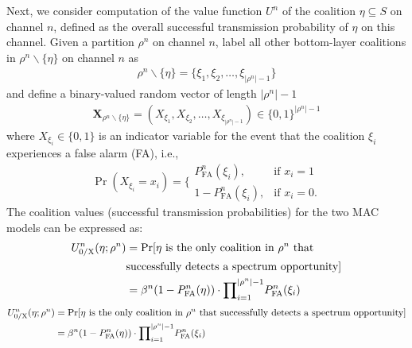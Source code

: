 \documentclass[journal,draftclsnofoot,onecolumn]{IEEEtran}
\theoremstyle{definition}
\newif\ifdoublecolumn
\begin{document}
Next, we consider computation of the value function $U^n$ of the coalition $\eta\subseteq S$ on channel $n$, defined as the overall successful transmission probability of $\eta$ on this channel. Given a partition $\rho^n$ on channel $n$, label all other bottom-layer coalitions in $\rho^n \backslash \{ \eta \}$ on channel $n$ as
\begin{equation}\label{Eq:ParitionExcept}
\begin{split}
\rho^n \backslash \{ \eta \}  {=} \{ {\xi _1},{\xi _2}, \ldots ,{\xi _{|\rho^n |- 1}}\}
\end{split}
\end{equation}
and define a binary-valued random vector of length $|\rho^n |{-} 1$ 
\begin{equation}\label{Eq:X}
\begin{split}
\mathbf{X}_{\rho^n\backslash\{\eta\}}=(X_{\xi_1},X_{\xi_2},\ldots,X_{\xi_{|\rho^n|-1}})\in\{0,1\}^{|\rho^n |- 1}
\end{split}
\end{equation}
where $X_{\xi_i}\!\in\!\{0,1\}$ is an indicator variable for the event that the coalition $\xi_i$ experiences a false alarm (FA), i.e.,
\begin{equation}\label{Eq:Indicator}
\Pr(X_{\xi_i}=x_i)=\Bigg\{\begin{matrix}
P_{\mathrm{FA}}^n({\xi _i}), & \textrm{if }x_i=1 \\ 
1-P_{\mathrm{FA}}^n({\xi _i}), & \textrm{if }x_i=0.
\end{matrix}
\end{equation}
The coalition values (successful transmission probabilities) for the two MAC models can be expressed as:
\ifdoublecolumn
\begin{align}\label{Eq:CoalValue0X}
U_\mathrm{0/X}^n(\eta;\rho^n)&=\Pr[\text{$\eta$ is the only coalition in $\rho^n$ that}\notag\\
&\text{successfully detects a spectrum opportunity}]\notag\\
&=\beta^n(1-P_\mathrm{FA}^n(\eta))\cdot{\prod\nolimits _{i=1}^{|\rho^n|-1}}P_\mathrm{FA}^n(\xi_i)
\end{align}
\else
\begin{align}\label{Eq:CoalValue0X}
U_\mathrm{0/X}^n(\eta;\rho^n)&=\Pr[\text{$\eta$ is the only coalition in $\rho^n$ that successfully detects a spectrum opportunity}]\notag\\
&=\beta^n(1-P_\mathrm{FA}^n(\eta))\cdot{\prod\nolimits _{i=1}^{|\rho^n|-1}}P_\mathrm{FA}^n(\xi_i)
\end{align}
\end{document}
